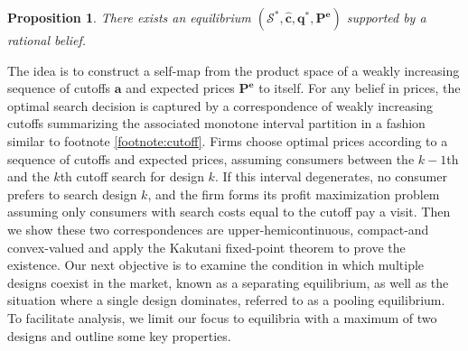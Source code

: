 \documentclass[14pt]{article}
\theoremstyle{plain}
\newtheorem{prop}[thm]{Proposition}
\theoremstyle{definition}
\theoremstyle{remark}
\DeclareRobustCommand\1{\futurelet\oneNext\oneCheck}
\renewcommand{\S}{\mathcal{S}}
\begin{document}
\begin{prop}
There exists an equilibrium $(\S^*, \mathbf{\hat{c}}, \mathbf{q^*}, \mathbf{P^e})$ supported by a rational belief.
\end{prop}
The idea is to construct a self-map from the product space of a weakly increasing sequence of cutoffs $\mathbf{a}$ and expected prices $\mathbf{P^e}$ to itself. For any belief in prices, the optimal search decision is captured by a correspondence of weakly increasing cutoffs summarizing the associated monotone interval partition in a fashion similar to footnote \ref{footnote:cutoff}. Firms choose optimal prices according to a sequence of cutoffs and expected prices, assuming consumers between the $k-1$th and the $k$th cutoff search for design $k$. If this interval degenerates, no consumer prefers to search design $k$, and the firm forms its profit maximization problem assuming only consumers with search costs equal to the cutoff pay a visit. Then we show these two correspondences are upper-hemicontinuous, compact-and convex-valued and apply the Kakutani fixed-point theorem to prove the existence. Our next objective is to examine the condition in which multiple designs coexist in the market, known as a separating equilibrium, as well as the situation where a single design dominates, referred to as a pooling equilibrium. To facilitate analysis, we limit our focus to equilibria with a maximum of two designs and outline some key properties.
\end{document}
